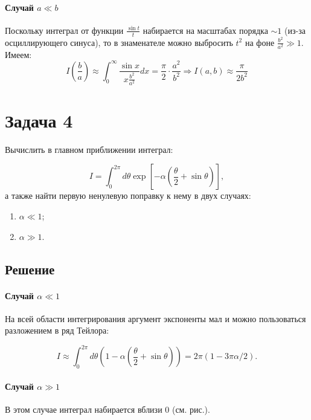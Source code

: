 \documentclass[a4paper,12pt]{article}
\begin{document}
\paragraph{Случай $a\ll b$}

Поскольку интеграл от функции $\frac{\sin t}{t}$ набирается на масштабах
порядка $\sim1$ (из-за осциллирующего синуса), то в знаменателе можно
выбросить $t^{2}$ на фоне $\frac{b^{2}}{a^{2}}\gg1$. Имеем:
\[
I\left(\frac{b}{a}\right)\approx\int_{0}^{\infty}\frac{\sin x}{x\frac{b^{2}}{a^{2}}}dx=\frac{\pi}{2}\cdot\frac{a^{2}}{b^{2}} \Rightarrow I(a,b) \approx \frac{\pi}{2 b^2}
\]

\section*{Задача 4}

Вычислить в главном приближении интеграл:

$$
I=\int_{0}^{2\pi}d\theta \exp\left[-\alpha\left(\frac{\theta}{2}+\sin\theta\right)\right],
$$
а также найти первую ненулевую поправку к нему в двух случаях:
\begin{multicols}{2}
\begin{enumerate}[label=\arabic*)]
    \item $\alpha\ll1$;
    \item $\alpha\gg1$.
\end{enumerate}
\end{multicols}
\noindent

\subsection*{Решение}

\paragraph{Случай $\alpha\ll 1$}

На всей области интегрирования аргумент экспоненты мал и можно пользоваться разложением в ряд Тейлора:

\[
I\approx\int_{0}^{2\pi}d\theta\left(1-\alpha\left(\frac{\theta}{2}+\sin\theta\right)\right)=2\pi\left(1-3\pi\alpha/2\right).
\]

\paragraph{Случай $\alpha\gg 1$}

В этом случае интеграл набирается вблизи 0 (см. рис.).
\end{document}
